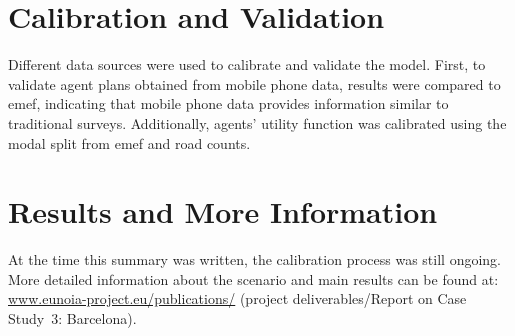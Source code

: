 \section{Calibration and Validation}
Different data sources were used to calibrate and validate the model. First, to validate agent plans obtained from mobile phone data, results were compared to \gls{emef}, indicating that mobile phone data provides information similar to traditional surveys. Additionally, agents' utility function was calibrated using the modal split from \gls{emef} and road counts.

\section{Results and More Information}
At the time this summary was written, the calibration process was still ongoing. More detailed information about the scenario and main results can be found at:
\url{www.eunoia-project.eu/publications/} (project deliverables/Report on Case Study~3: Barcelona).

